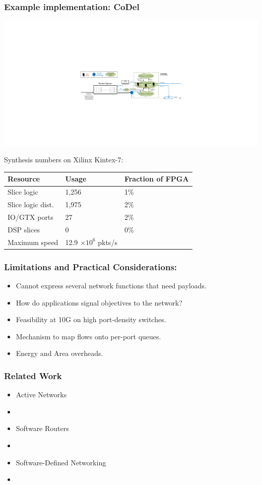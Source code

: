 \begin{frame}[plain]
\frametitle{Example implementation: CoDel}
\begin{center}
\includegraphics[width=\columnwidth]{codel.pdf}
\end{center}
\begin{center}
Synthesis numbers on Xilinx Kintex-7: \\
\begin{tabular}{lll}
\bf Resource & \bf Usage & \bf Fraction of FPGA \\
\hline Slice logic & 1,256 & 1\% \\
Slice logic dist. & 1,975 & 2\% \\
IO/GTX ports & 27 & 2\% \\
DSP slices & 0 & 0\% \\
Maximum speed & 12.9 $\times 10^6$ pkts/s \\
\end{tabular}
\end{center}
\end{frame}

\begin{frame}[plain]
\frametitle{Limitations and Practical Considerations:}
\begin{itemize}
\item Cannot express several network functions that need payloads.
\item How do applications signal objectives to the network?
\item Feasibility at 10G on high port-density  switches.
\item Mechanism to map flows onto per-port queues.
\item Energy and Area overheads.
\end{itemize}
\end{frame}

\begin{frame}[plain]

\frametitle{Related Work}
\begin{itemize}

\item Active Networks
\item[]

\item Software Routers
\item[]

\item Software-Defined Networking
\item[]

\end{itemize}
\end{frame}


